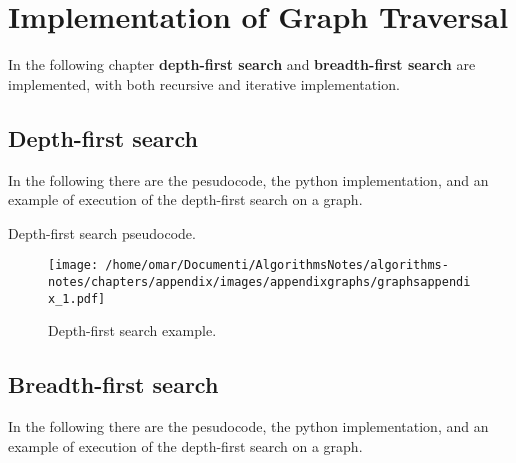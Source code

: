 \chapter{Implementation of Graph Traversal}
\label{graphimplementationtraversalappendix}
In the following chapter \textbf{depth-first search} and \textbf{breadth-first search} are implemented, with both recursive and iterative implementation.
\section{Depth-first search}
In the following there are the pesudocode, the python implementation, and an example of execution of the depth-first search on a graph.

\begin{algorithm}[H]
	\DontPrintSemicolon
	\LinesNumbered
  	\;
\caption{Depth-first search pseudocode.}
\end{algorithm}

\begin{figure}[H]
	\begin{center}
		\texttt{[image: /home/omar/Documenti/AlgorithmsNotes/algorithms-notes/chapters/appendix/images/appendixgraphs/graphsappendix\_1.pdf]}
		\caption[Depth-first search example.]{Depth-first search example.}
		\label{graphappendix_1}
	\end{center}
\end{figure}

\section{Breadth-first search}
In the following there are the pesudocode, the python implementation, and an example of execution of the depth-first search on a graph.

